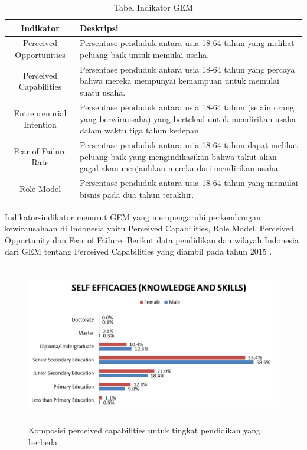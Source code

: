 \begin{table}[H]
\centering
\caption{Tabel Indikator GEM}
\begin{tabular}{|c|p{8cm}|}
\hline
Indikator & Deskripsi\\
\hline
Perceived Opportunities & Persentase penduduk antara usia 18-64 tahun yang melihat peluang baik untuk memulai usaha. \\
\hline
Perceived Capabilities & Persentase penduduk antara usia 18-64 tahun yang percaya bahwa mereka mempunyai kemampuan untuk memulai suatu usaha. \\
\hline
Entreprenurial Intention & Persentase penduduk antara usia 18-64 tahun (selain orang yang berwirausaha) yang bertekad untuk mendirikan usaha dalam waktu tiga tahun kedepan.\\
\hline
Fear of Failure Rate & Persentase penduduk antara usia 18-64 tahun dapat melihat peluang baik yang mengindikasikan bahwa takut akan gagal akan menjauhkan mereka dari mendirikan usaha. \\
\hline
Role Model & Persentase penduduk antara usia 18-64 tahun yang memulai bisnis pada dua tahun terakhir.\\
\hline
\end{tabular}
\label{tabelindikator}
\end{table}



Indikator-indikator menurut GEM yang mempengaruhi perkembangan kewirausahaan di Indonesia yaitu Perceived Capabilities, Role Model, Perceived Opportunity dan Fear of Failure. Berikut data pendidikan dan wilayah Indonesia dari GEM tentang Perceived Capabilities yang diambil pada tahun 2015 \cite{dataGEM}.


\begin{figure} [H]
	\centering  
	\includegraphics[width=14cm, height=7cm]{PCPendidikan} 
	\caption[Komposisi perceived capabilities untuk tingkat pendidikan yang berbeda]{Komposisi perceived capabilities untuk tingkat pendidikan yang berbeda} 
	\label{fig:PCPendidikan} 
\end{figure}

